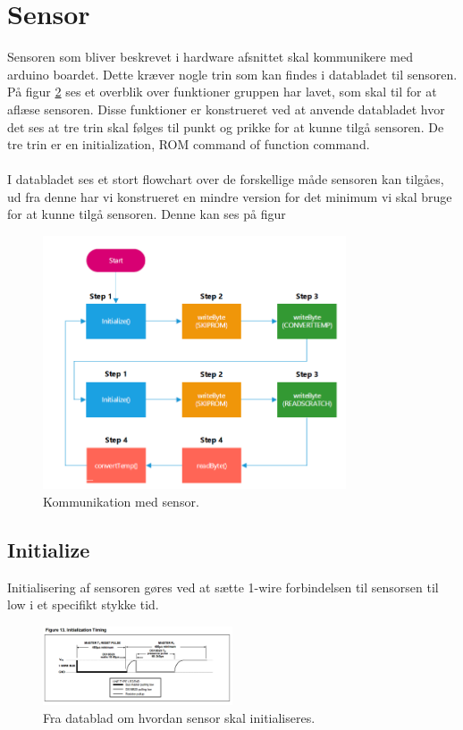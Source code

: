 \section{Sensor}
Sensoren som bliver beskrevet i hardware afsnittet skal kommunikere med arduino boardet. Dette kræver nogle trin som kan findes i databladet til sensoren. På figur \ref{sensor_kom} ses et overblik over funktioner gruppen har lavet, som skal til for at aflæse sensoren. Disse funktioner er konstrueret ved at anvende databladet hvor det ses at tre trin skal følges til punkt og prikke for at kunne tilgå sensoren. De tre trin er en initialization, ROM command of function command.
\\
\\
I databladet ses et stort flowchart over de forskellige måde sensoren kan tilgåes, ud fra denne har vi konstrueret en mindre version for det minimum vi skal bruge for at kunne tilgå sensoren. Denne kan ses på figur 

\begin{figure}[h!]
  \centering
  \includegraphics[width=0.8\textwidth]{figures/sensor_communication.png}
  \caption{Kommunikation med sensor.}
  \label{sensor_kom}
\end{figure}

\newpage
\subsection{Initialize}
Initialisering af sensoren gøres ved at sætte 1-wire forbindelsen til sensorsen til low i et specifikt stykke tid.

\begin{figure}[h!]
  \centering
  \includegraphics[width=0.5\textwidth]{figures/Initialization_timing.png}
  \caption{Fra datablad om hvordan sensor skal initialiseres.}
  \label{sensor_kom}
\end{figure}

